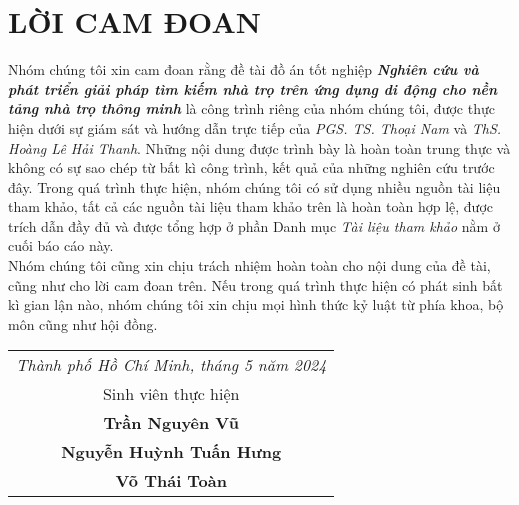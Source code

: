 \chapter*{LỜI CAM ĐOAN}
\hspace*{1cm} Nhóm chúng tôi xin cam đoan rằng đề tài đồ án tốt nghiệp \textit{\textbf{Nghiên cứu và phát triển giải pháp tìm kiếm nhà trọ trên ứng dụng di động cho nền tảng nhà trọ thông minh}} là công trình riêng của nhóm chúng tôi, được thực hiện dưới sự giám sát và hướng dẫn trực tiếp của \textit{PGS. TS. Thoại Nam} và \textit{ThS. Hoàng Lê Hải Thanh}. Những nội dung được trình bày là hoàn toàn trung thực và không có sự sao chép từ bất kì công trình, kết quả của những nghiên cứu trước đây. Trong quá trình thực hiện, nhóm chúng tôi có sử dụng nhiều nguồn tài liệu tham khảo, tất cả các nguồn tài liệu tham khảo trên là hoàn toàn hợp lệ, được trích dẫn đầy đủ và được tổng hợp ở phần Danh mục \textit{Tài liệu tham khảo} nằm ở cuối báo cáo này.\\
\hspace*{1cm} Nhóm chúng tôi cũng xin chịu trách nhiệm hoàn toàn cho nội dung của đề tài, cũng như cho lời cam đoan trên. Nếu trong quá trình thực hiện có phát sinh bất kì gian lận nào, nhóm chúng tôi xin chịu mọi hình thức kỷ luật từ phía khoa, bộ môn cũng như hội đồng.\\
\begin{table}[h]
    \large
    \hspace{8cm}
    \begin{tabular}{c}
    \textit{Thành phố Hồ Chí Minh, tháng 5 năm 2024}\\
    Sinh viên thực hiện\\
    \bf Trần Nguyên Vũ \\
    \bf Nguyễn Huỳnh Tuấn Hưng \\
    \bf Võ Thái Toàn\\
    \end{tabular}
\end{table}